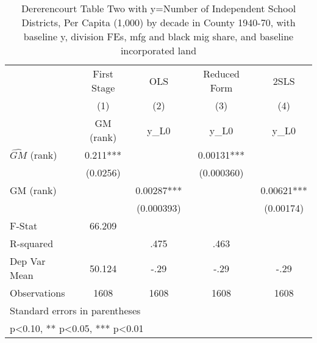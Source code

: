 \begin{table}[htbp]\centering
\def\sym#1{\ifmmode^{#1}\else\(^{#1}\)\fi}
\caption{Dererencourt Table Two with y=Number of Independent School Districts, Per Capita (1,000) by decade in County 1940-70, with baseline y, division FEs, mfg and black mig share, and baseline incorporated land}
\begin{tabular}{l*{4}{c}}
\toprule
                    & First Stage   &         OLS   &Reduced Form   &        2SLS   \\
                    &\multicolumn{1}{c}{(1)}&\multicolumn{1}{c}{(2)}&\multicolumn{1}{c}{(3)}&\multicolumn{1}{c}{(4)}\\
                    &\multicolumn{1}{c}{GM  (rank)}&\multicolumn{1}{c}{y\_L0}&\multicolumn{1}{c}{y\_L0}&\multicolumn{1}{c}{y\_L0}\\
\midrule
$\hat{GM}$ (rank)   &       0.211***&               &     0.00131***&               \\
                    &    (0.0256)   &               &  (0.000360)   &               \\
\addlinespace
GM  (rank)          &               &     0.00287***&               &     0.00621***\\
                    &               &  (0.000393)   &               &   (0.00174)   \\
\midrule
F-Stat              &      66.209   &               &               &               \\
R-squared           &               &        .475   &        .463   &               \\
Dep Var Mean        &      50.124   &        -.29   &        -.29   &        -.29   \\
Observations        &        1608   &        1608   &        1608   &        1608   \\
\bottomrule
\multicolumn{5}{l}{\footnotesize Standard errors in parentheses}\\
\multicolumn{5}{l}{\footnotesize * p<0.10, ** p<0.05, *** p<0.01}\\
\end{tabular}
\end{table}

